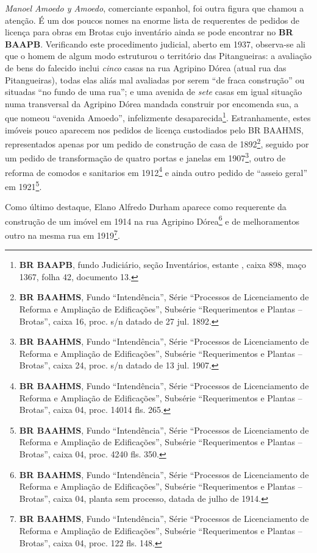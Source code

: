 \textit{Manoel Amoedo y Amoedo}, comerciante espanhol, foi outra figura que chamou a atenção. É um dos poucos nomes na enorme lista de requerentes de pedidos de licença para obras em Brotas cujo inventário ainda se pode encontrar no \textbf{BR BAAPB}. Verificando este procedimento judicial, aberto em 1937, observa-se ali que o homem de algum modo estruturou o território das Pitangueiras: a avaliação de bens do falecido inclui \textit{cinco} casas na rua Agripino Dórea (atual rua das Pitangueiras), todas elas aliás mal avaliadas por serem ``de fraca construção'' ou situadas ``no fundo de uma rua''; e uma avenida de \textit{sete} casas em igual situação numa transversal da Agripino Dórea mandada construir por encomenda sua, a que nomeou ``avenida Amoedo'', infelizmente desaparecida\footnote{\textbf{BR BAAPB}, fundo Judiciário, seção Inventários, estante , caixa 898, maço 1367, folha 42, documento 13.}. Estranhamente, estes imóveis pouco aparecem nos pedidos de licença custodiados pelo BR BAAHMS, representados apenas por um pedido de construção de casa de 1892\footnote{\textbf{BR BAAHMS}, Fundo ``Intendência'', Série ``Processos de Licenciamento de Reforma e Ampliação de Edificações'', Subsérie ``Requerimentos e Plantas -- Brotas'', caixa 16, proc. s/n datado de 27 jul. 1892.}, seguido por um pedido de transformação de quatro portas e janelas em 1907\footnote{\textbf{BR BAAHMS}, Fundo ``Intendência'', Série ``Processos de Licenciamento de Reforma e Ampliação de Edificações'', Subsérie ``Requerimentos e Plantas -- Brotas'', caixa 24, proc. s/n datado de 13 jul. 1907.}, outro de reforma de comodos e sanitarios em 1912\footnote{\textbf{BR BAAHMS}, Fundo ``Intendência'', Série ``Processos de Licenciamento de Reforma e Ampliação de Edificações'', Subsérie ``Requerimentos e Plantas -- Brotas'', caixa 04, proc. 14014 fls. 265.} e ainda outro pedido de ``asseio geral'' em 1921\footnote{\textbf{BR BAAHMS}, Fundo ``Intendência'', Série ``Processos de Licenciamento de Reforma e Ampliação de Edificações'', Subsérie ``Requerimentos e Plantas -- Brotas'', caixa 04, proc. 4240 fls. 350.}.

Como último destaque, Elano Alfredo Durham aparece como requerente da construção de um imóvel em 1914 na rua Agripino Dórea\footnote{\textbf{BR BAAHMS}, Fundo ``Intendência'', Série ``Processos de Licenciamento de Reforma e Ampliação de Edificações'', Subsérie ``Requerimentos e Plantas -- Brotas'', caixa 04, planta sem processo, datada de julho de 1914.} e de melhoramentos outro na mesma rua em 1919\footnote{\textbf{BR BAAHMS}, Fundo ``Intendência'', Série ``Processos de Licenciamento de Reforma e Ampliação de Edificações'', Subsérie ``Requerimentos e Plantas -- Brotas'', caixa 04, proc. 122 fls. 148.}.

